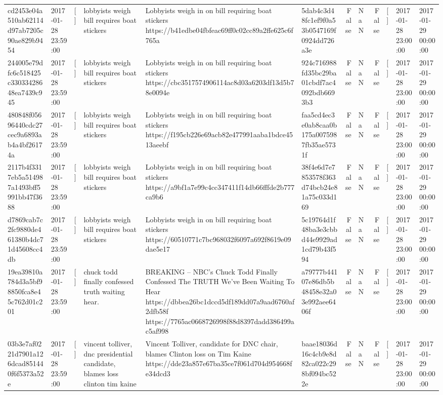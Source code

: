 \begin{tabular}{llllllrlrlll}
cd2453e04a510ab62114d97ab7205c90ae829b9454 & 2017-01-28 23:59:00 & [] & lobbyists weigh bill requires boat stickers & Lobbyists weigh in on bill requiring boat stickers https://b41edbe04fbfeac69ff0c02cc89a2ffe625c6f765a & 5dab4c3d48fc1ef9f0a53b0547169f0924dd726a3e & False & NaN & False & [] & 2017-01-28 23:00:00 & 2017-01-29 00:00:00 \\
244005e79dfc6c518425c33033428648ea7439c945 & 2017-01-28 23:59:00 & [] & lobbyists weigh bill requires boat stickers & Lobbyists weigh in on bill requiring boat stickers https://cbc3517574906114ac8d03a6203df13d5b78e0094e & 924c716988fd35bc29ba01cbdf7ac4092bdb6693b3 & False & NaN & False & [] & 2017-01-28 23:00:00 & 2017-01-29 00:00:00 \\
480848f05696440cdc27cec9a6893ab4a4bf26174a & 2017-01-28 23:59:00 & [] & lobbyists weigh bill requires boat stickers & Lobbyists weigh in on bill requiring boat stickers https://f195cb226e69acb82e477991aaba1bdce4513aeebf & faa5cd4ec3e0ab8caa0b175a0075987fb35ae5731f & False & NaN & False & [] & 2017-01-28 23:00:00 & 2017-01-29 00:00:00 \\
2117b4f3317eb5a514987a1493bff5991bb47f3688 & 2017-01-28 23:59:00 & [] & lobbyists weigh bill requires boat stickers & Lobbyists weigh in on bill requiring boat stickers https://a9bf1a7e99c4cc347411f14db66fffde2b777ca9b6 & 38f4e6d7e7853578f363d74bcb24e81a75c033d169 & False & NaN & False & [] & 2017-01-28 23:00:00 & 2017-01-29 00:00:00 \\
d7869cab7c2fc9880de461380b4dc71d45608cc4db & 2017-01-28 23:59:00 & [] & lobbyists weigh bill requires boat stickers & Lobbyists weigh in on bill requiring boat stickers https://60510771c7bc968032f6097a692f8619e09dae5e17 & 5c19764d1f48ba3e3cbbd44e9929ad1cd79b43f594 & False & NaN & False & [] & 2017-01-28 23:00:00 & 2017-01-29 00:00:00 \\
19ea39810a784d3a5bf98850fca8e45c762d01c201 & 2017-01-28 23:59:00 & [] & chuck todd finally confessed truth waiting hear. & BREAKING – NBC’s Chuck Todd Finally Confessed The TRUTH We’ve Been Waiting To Hear https://dbbea26bc1dccd5df189dd07a9aad6760af2dfb58f https://7765ac0668726998f88d8397dadd386499ac5af998 & a79777b44107e86db5b48458e32a03e992aee6406f & False & NaN & False & [] & 2017-01-28 23:00:00 & 2017-01-29 00:00:00 \\
03b3e7af0221d7901a126dcad851440f6f5373a52e & 2017-01-28 23:59:00 & [] & vincent tolliver, dnc presidential candidate, blames loss clinton tim kaine & Vincent Tolliver, candidate for DNC chair, blames Clinton loss on Tim Kaine https://dde23a857e67ba35ce7f061d704d954668fe34dcd3 & baae18036d16c4cb9e8d82ca022c298bf094bc522e & False & NaN & False & [] & 2017-01-28 23:00:00 & 2017-01-29 00:00:00 \\

\end{tabular}
